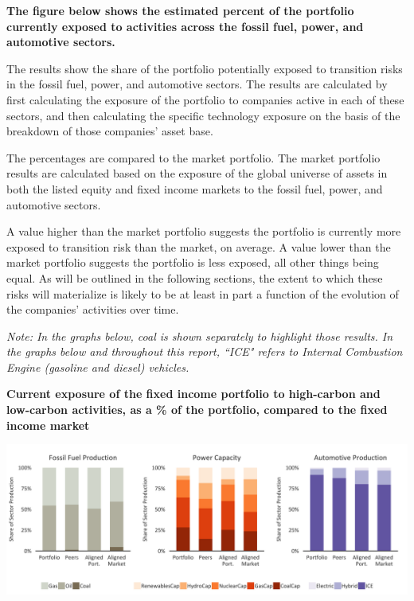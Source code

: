 \documentclass[10pt,table,a4]{article}\usepackage[]{graphicx}\usepackage[]{color}
\begin{document}
	\begin{multicols}{2}
		
		\textbf{The figure below shows the estimated percent of the portfolio currently exposed to activities across the fossil fuel, power, and automotive sectors.}
		
		The results show the share of the portfolio potentially exposed to transition risks in the fossil fuel, power, and automotive sectors. The results are calculated by first calculating the exposure of the portfolio to companies active in each of these sectors, and then calculating the specific technology exposure on the basis of the breakdown of those companies' asset base.      
		
		The percentages are compared to the market portfolio. The market portfolio results are calculated based on the exposure of the global universe of assets in both the listed equity and fixed income markets to the fossil fuel, power, and automotive sectors.
		
		A value higher than the market portfolio suggests the portfolio is currently more exposed to transition risk than the market, on average. A value lower than the market portfolio suggests the portfolio is less exposed, all other things being equal. As will be outlined in the following sections, the extent to which these risks will materialize is likely to be at least in part a function of the evolution of the companies' activities over time. 
		
		\textit{Note: In the graphs below, coal is shown separately to highlight those results. In the graphs below and throughout this report, ``ICE" refers to Internal Combustion Engine (gasoline and diesel) vehicles.}
		
	\end{multicols}
	
	\textbf{Current exposure of the fixed income portfolio to high-carbon and low-carbon activities, as a \% of the portfolio, compared to the fixed income market}	
	
	\includegraphics[trim = {0 0cm 0 0cm},width=1\linewidth]{CAFigures/Fig05} 
	
\end{document}
